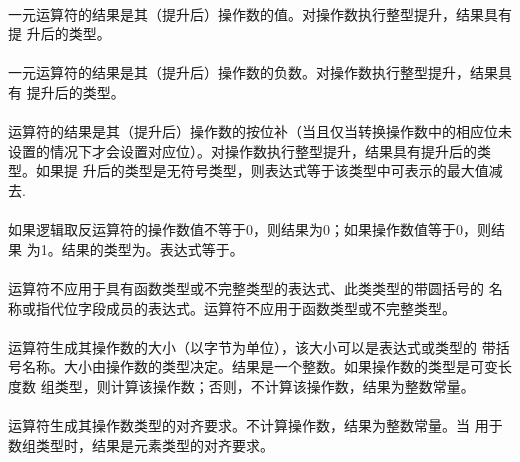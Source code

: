 \semantic
\paragraph{}
一元\tm{+}运算符的结果是其（提升后）操作数的值。对操作数执行整型提升，结果具有提
升后的类型。

\paragraph{}
一元\tm{-}运算符的结果是其（提升后）操作数的负数。对操作数执行整型提升，结果具有
提升后的类型。

\paragraph{}
\tm{\~}运算符的结果是其（提升后）操作数的按位补（当且仅当转换操作数中的相应位未
设置的情况下才会设置对应位）。对操作数执行整型提升，结果具有提升后的类型。如果提
升后的类型是无符号类型，则表达式等于该类型中可表示的最大值减去.

\paragraph{}
如果逻辑取反运算符\tm{!}的操作数值不等于0，则结果为0；如果操作数值等于0，则结果
为1。结果的类型为。表达式等于。

\constraint
\paragraph{}
运算符不应用于具有函数类型或不完整类型的表达式、此类类型的带圆括号的
名称或指代位字段成员的表达式。运算符不应用于函数类型或不完整类型。

\semantic
\paragraph{}
运算符生成其操作数的大小（以字节为单位），该大小可以是表达式或类型的
带括号名称。大小由操作数的类型决定。结果是一个整数。如果操作数的类型是可变长度数
组类型，则计算该操作数；否则，不计算该操作数，结果为整数常量。

\paragraph{}
运算符生成其操作数类型的对齐要求。不计算操作数，结果为整数常量。当
用于数组类型时，结果是元素类型的对齐要求。

